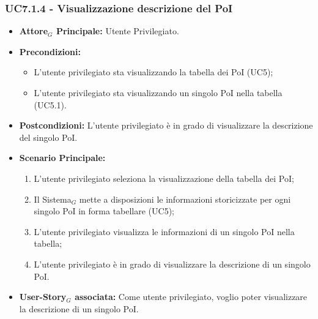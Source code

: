 \documentclass[10pt]{article}
\begin{document}
\begin{justify}
\subsubsection{\textbf{UC7.1.4 - Visualizzazione descrizione del PoI}}
\label{UC7.1.4}
\begin{itemize}
    \item \textbf{Attore$_G$ Principale:} Utente Privilegiato.
    \item \textbf{Precondizioni:} 
        \begin{itemize}
          \item L'utente privilegiato sta visualizzando la tabella dei PoI (UC5);
            \item L'utente privilegiato sta visualizzando un singolo PoI nella tabella (UC5.1).
        \end{itemize}
      \item \textbf{Postcondizioni:} L'utente privilegiato è in grado di visualizzare la descrizione del singolo PoI.
    \item \textbf{Scenario Principale:} 
        \begin{enumerate}
        \item L'utente privilegiato seleziona la visualizzazione della tabella dei PoI;
          \item Il Sistema$_G$ mette a disposizioni le informazioni storicizzate per ogni singolo PoI in forma tabellare (UC5);
          \item L'utente privilegiato visualizza le informazioni di un singolo PoI nella tabella;
            \item L'utente privilegiato è in grado di visualizzare la descrizione di un singolo PoI.
        \end{enumerate}
    \item \textbf{User-Story$_G$ associata:} Come utente privilegiato, voglio poter visualizzare la descrizione di un singolo PoI.
\end{itemize}

\end{justify}
\end{document}
